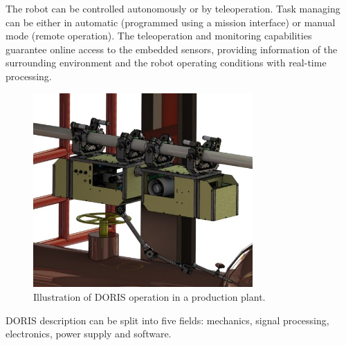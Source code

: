 \documentclass{ifacconf}
\begin{document}
The robot can be controlled autonomously or by teleoperation. Task managing can
be either in automatic (programmed using a mission interface) or manual mode
(remote operation). The teleoperation and monitoring capabilities
guarantee online access to the embedded sensors, providing information of the
surrounding environment and the robot operating conditions with real-time
processing.

\begin{figure}[ht]
\centering
\includegraphics[width=8.4cm]{figs/cenario5_crop.jpg}
\caption{Illustration of DORIS operation in a production plant.}
\label{fig:DORIS-overview}
\end{figure}

DORIS description can be split into five fields: mechanics,
signal processing, electronics, power supply and software.


\end{document}
